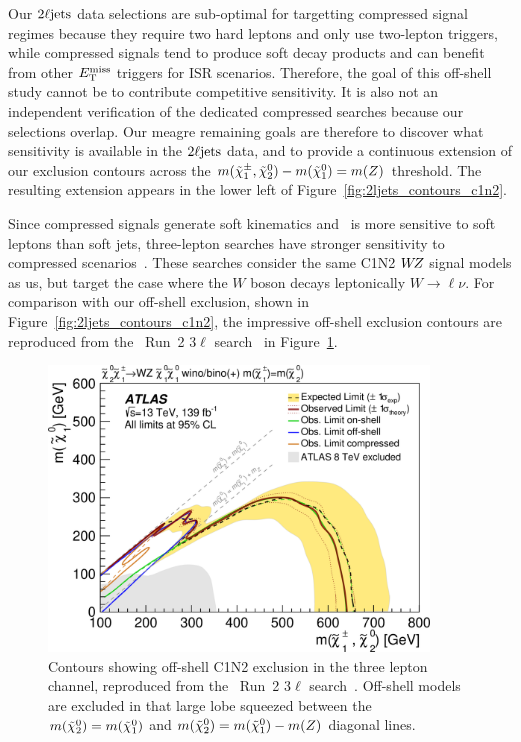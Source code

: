 Our $2\ell\mathrm{jets}$ data selections are sub-optimal for targetting compressed
signal regimes because they require two hard leptons and only use two-lepton
triggers, while compressed signals tend to produce soft decay products and
can benefit from other $E_\mathrm{T}^\mathrm{miss}$ triggers for ISR scenarios.
Therefore, the goal of this off-shell study cannot be to contribute
competitive sensitivity.
It is also not an independent verification of the dedicated compressed
searches because our selections overlap.
Our meagre remaining goals are therefore to discover what sensitivity is
available in the $2\ell\mathrm{jets}$ data, and to provide a continuous extension of our
exclusion contours across the
$m(\tilde\chi^\pm_1, \tilde\chi^0_2) - m(\tilde\chi^0_1) = m(Z)$ threshold.
The resulting extension appears in the lower left of
Figure~\ref{fig:2ljets_contours_c1n2}.

Since compressed signals generate soft kinematics and \atlas\ is more sensitive
to soft leptons than soft jets, three-lepton searches have stronger sensitivity
to compressed scenarios~\cite{atlas_rjr_3l_SUSY_2019_09}.
These searches consider the same C1N2 $W\kern-0.4exZ$ signal models as us, but target the
case where the $W$ boson decays leptonically $W\to\ell\nu$.
For comparison with our off-shell exclusion,
shown in Figure~\ref{fig:2ljets_contours_c1n2},
the impressive off-shell exclusion contours are reproduced
from the \atlas\ Run~2 $3\ell$ search~\cite{atlas_rjr_3l_SUSY_2019_09} in
Figure~\ref{fig:ljets_offshell_3l_exclusion}.

\begin{figure}[tp]
\centering
\includegraphics[width=0.9\textwidth]{figures/2ljets_compressed_3l_ins1866951_fig_16a.png}
\caption[
Contours showing off-shell C1N2 exclusion from the \atlas\ Run~2 $3\ell$ search
]{%
Contours showing off-shell C1N2 exclusion in the three lepton channel,
reproduced from the \atlas\ Run~2 $3\ell$
search~\cite{atlas_rjr_3l_SUSY_2019_09, hepdata.95751}.
Off-shell models are excluded in that large lobe squeezed between the
$m(\tilde\chi^0_2) = m(\tilde\chi^0_1)$ and
$m(\tilde\chi^0_2) = m(\tilde\chi^0_1) - m(Z)$ diagonal lines.
}
\label{fig:ljets_offshell_3l_exclusion}
\end{figure}

